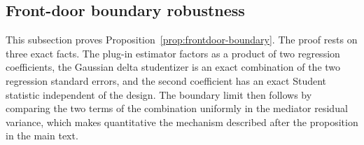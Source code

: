 \documentclass[12pt,a4paper]{article}
\theoremstyle{plain}
\theoremstyle{definition}
\begin{document}
\subsection{Front-door boundary robustness}
\label{supp:frontdoor-boundary}

This subsection proves Proposition~\ref{prop:frontdoor-boundary}.
The proof rests on three exact facts.
The plug-in estimator factors as a product of two regression coefficients, the Gaussian delta studentizer is an exact combination of the two regression standard errors, and the second coefficient has an exact Student statistic independent of the design.
The boundary limit then follows by comparing the two terms of the combination uniformly in the mediator residual variance, which makes quantitative the mechanism described after the proposition in the main text.
\end{document}
